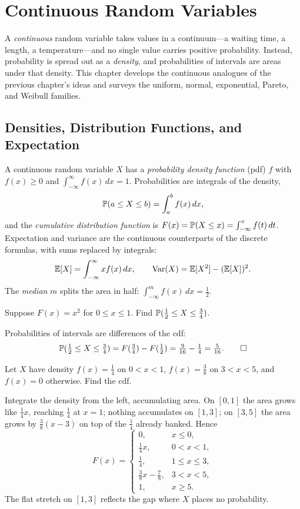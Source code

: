 \chapter{Continuous Random Variables}
\label{ch:continuous}

A \emph{continuous} random variable takes values in a continuum—a waiting time,
a length, a temperature—and no single value carries positive probability.
Instead, probability is spread out as a \emph{density}, and probabilities of
intervals are areas under that density. This chapter develops the continuous
analogues of the previous chapter's ideas and surveys the uniform, normal,
exponential, Pareto, and Weibull families.

\section{Densities, Distribution Functions, and Expectation}

A continuous random variable $X$ has a \emph{probability density function} (pdf)
$f$ with $f(x)\ge 0$ and $\int_{-\infty}^{\infty}f(x)\,dx=1$. Probabilities are
integrals of the density,
\[
  \mathbb{P}(a\le X\le b)=\int_a^b f(x)\,dx,
\]
and the \emph{cumulative distribution function} is
$F(x)=\mathbb{P}(X\le x)=\int_{-\infty}^{x}f(t)\,dt$. Expectation and variance are the
continuous counterparts of the discrete formulas, with sums replaced by
integrals:
\[
  \mathbb{E}[X]=\int_{-\infty}^{\infty} x f(x)\,dx,\qquad
  \mathrm{Var}(X)=\mathbb{E}[X^2]-(\mathbb{E}[X])^2.
\]
The \emph{median} $m$ splits the area in half: $\int_{-\infty}^m f(x)\,dx=\tfrac12$.

\begin{example}
Suppose $F(x)=x^2$ for $0\le x\le 1$. Find $\mathbb{P}(\tfrac12\le X\le\tfrac34)$.

\solution Probabilities of intervals are differences of the cdf:
\[
  \mathbb{P}(\tfrac12\le X\le\tfrac34)=F(\tfrac34)-F(\tfrac12)=\tfrac{9}{16}-\tfrac14=\tfrac{5}{16}. \qedhere
\]
\end{example}

\begin{example}
Let $X$ have density $f(x)=\tfrac14$ on $0<x<1$, $f(x)=\tfrac38$ on $3<x<5$, and
$f(x)=0$ otherwise. Find the cdf.

\solution Integrate the density from the left, accumulating area. On $[0,1]$ the
area grows like $\tfrac14 x$, reaching $\tfrac14$ at $x=1$; nothing accumulates
on $[1,3]$; on $[3,5]$ the area grows by $\tfrac38(x-3)$ on top of the
$\tfrac14$ already banked. Hence
\[
  F(x)=
  \begin{cases}
   0, & x\le 0,\\
   \tfrac14 x, & 0<x<1,\\
   \tfrac14, & 1\le x\le 3,\\
   \tfrac38 x-\tfrac78, & 3<x<5,\\
   1, & x\ge 5.
  \end{cases}
\]
The flat stretch on $[1,3]$ reflects the gap where $X$ places no probability.
\end{example}

